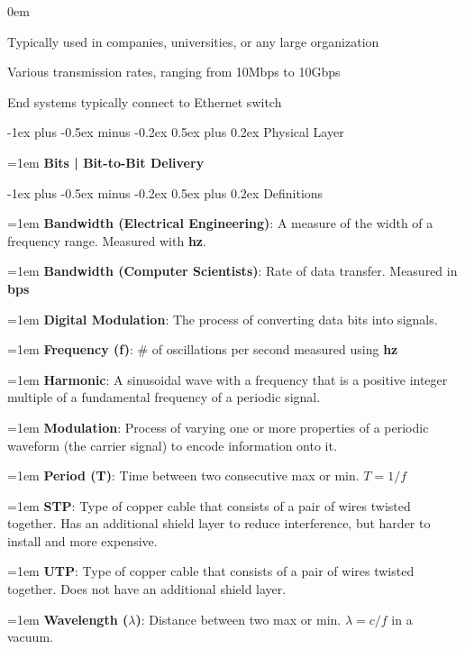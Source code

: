 \documentclass[letterpaper,8pt]{extarticle}
\makeatletter
\newcommand{\definition}[2]{
  \hangindent=1em
  \textbf{#1}: #2%
}
\newcommand{\subtitle}[2]{
  \hangindent=1em
  \textbf{\color{h4}#1 | #2}\\
  \hrulefill
}
\renewcommand{\section}{\@startsection{section}{1}{0mm}%
  {-1ex plus -0.5ex minus -0.2ex}%
  {0.5ex plus 0.2ex}%
{\color{h1} \normalfont\small\bfseries}}
\renewcommand{\subsection}{\@startsection{subsection}{2}{0mm}%
  {-1ex plus -0.5ex minus -0.2ex}%
  {0.5ex plus 0.2ex}%
{\color{h2}\normalfont\fontsize{6}{6}\selectfont\bfseries}}
\let\olditemize\itemize \let\endolditemize\enditemize
\renewenvironment{itemize}{\olditemize \itemsep0em}{\endolditemize}
\makeatother
\begin{document}
\begin{multicols*}{5}
  \begin{itemize}
    \item Typically used in companies, universities, or any large organization
    \item Various transmission rates, ranging from 10Mbps to 10Gbps
    \item End systems typically connect to Ethernet switch
  \end{itemize}
  
  \section{Physical Layer}
  
  \subtitle{Bits}{Bit-to-Bit Delivery}
  
  \subsection{Definitions}
  
  \definition{Bandwidth (Electrical Engineering)}{A measure of the
    width of a frequency range. Measured with \textbf{hz}.}
  
  \definition{Bandwidth (Computer Scientists)}{Rate of data transfer.
    Measured in \textbf{bps}}
  
  \definition{Digital Modulation}{The process of converting data bits
    into signals.}
  
  \definition{Frequency (f)}{\# of oscillations per second measured using \textbf{hz}}
  
  \definition{Harmonic}{A sinusoidal wave with a frequency that is a positive integer multiple of a fundamental frequency of a periodic signal.}
  
  \definition{Modulation}{Process of varying one or more properties of a periodic waveform (the carrier signal) to encode information onto it.}
  
  \definition{Period (T)}{Time between two consecutive max or min. $T = 1/f$}
  
  \definition{STP}{Type of copper cable that consists of a pair of wires twisted together. Has an additional shield layer to reduce interference, but harder to install and more expensive.}
  
  \definition{UTP}{Type of copper cable that consists of a pair of wires twisted together. Does not have an additional shield layer.}
  
  \definition{Wavelength ($\lambda$)}{Distance between two max or min. $\lambda = c/f$ in a vacuum.}
  

\end{multicols*}
\end{document}

